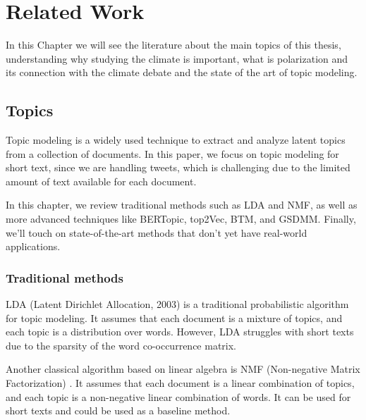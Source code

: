 
\chapter{Related Work}%
\label{Ch:related}

\ifpdf
    \graphicspath{{Chapter2/Figs/Raster/}{Chapter2/Figs/PDF/}{Chapter2/Figs/}}
\else
    \graphicspath{{Chapter2/Figs/Vector/}{Chapter2/Figs/}}
\fi

In this Chapter we will see the literature about the main topics of this thesis, understanding why studying the climate is important, what is polarization and its connection with the climate debate and the state of the art of topic modeling.

\section[Topics]{Topics}
Topic modeling is a widely used technique to extract and analyze latent topics from a collection of documents. In this paper, we focus on topic modeling for short text, since we are handling tweets, which is challenging due to the limited amount of text available for each document. 

In this chapter, we review traditional methods such as LDA and NMF, as well as more advanced techniques like BERTopic, top2Vec, BTM, and GSDMM. Finally, we'll touch on state-of-the-art methods that don't yet have real-world applications.

\subsection{Traditional methods}
LDA (Latent Dirichlet Allocation, 2003)\cite{blei_latent_2003} is a traditional probabilistic algorithm for topic modeling. It assumes that each document is a mixture of topics, and each topic is a distribution over words. However, LDA struggles with short texts due to the sparsity of the word co-occurrence matrix.

Another classical algorithm based on linear algebra is NMF (Non-negative Matrix Factorization) \cite{lee_algorithms_2000}\cite{kuang_nonnegative_2015}. It assumes that each document is a linear combination of topics, and each topic is a non-negative linear combination of words. It can be used for short texts and could be used as a baseline method.

